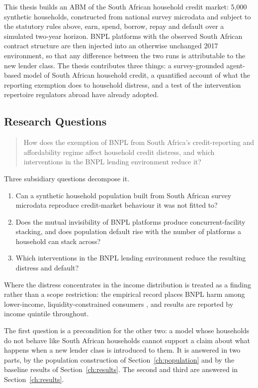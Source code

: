 This thesis builds an \ac{ABM} of the South African
household credit market: 5{,}000 synthetic households, constructed from national survey microdata
and subject to the statutory rules above, earn, spend, borrow, repay and default over a simulated
two-year horizon. \ac{BNPL} platforms with the observed South African contract structure are then injected
into an otherwise unchanged 2017 environment, so that any difference between the two runs is
attributable to the new lender class. The thesis contributes
three things: a survey-grounded agent-based model of South African household credit, a quantified
account of what the reporting exemption does to household distress, and a test of the
intervention repertoire regulators abroad have already adopted.

\subsection{Research Questions}
\label{sec:rqs}

\begin{quote}
    How does the exemption of \ac{BNPL} from South Africa's credit-reporting and affordability
    regime affect household credit distress, and which interventions in the \ac{BNPL} lending
    environment reduce it?
\end{quote}

Three subsidiary questions decompose it.

\begin{enumerate}
    \item Can a synthetic household population built from South African survey microdata reproduce
    credit-market behaviour it was not fitted to?
    \item Does the mutual invisibility of \ac{BNPL} platforms produce concurrent-facility
    stacking, and does population default rise with the number of platforms a household can stack
    across?
    \item Which interventions in the \ac{BNPL} lending environment reduce the resulting distress
    and default?
\end{enumerate}

Where the distress concentrates in the income distribution is treated as a finding rather than a
scope restriction: the empirical record places \ac{BNPL} harm among lower-income,
liquidity-constrained consumers \cite{hayashi2025constraints, wang2026buynow}, and results are
reported by income quintile throughout.

The first question is a precondition for the other two: a model whose households do not behave
like South African households cannot support a claim about what happens when a new lender class is
introduced to them. It is answered in two parts, by the population construction of
Section~\ref{ch:population} and by the baseline results of Section~\ref{ch:results}. The second
and third are answered in Section~\ref{ch:results}.